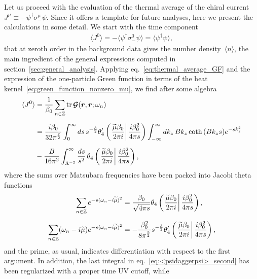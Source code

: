 \documentclass[11pt,a4paper]{article}
\begin{document}
Let us proceed with the evaluation of the thermal average of the chiral 
current~$J^{\mu}\equiv -\psi^{\dagger}\sigma^{\mu}_{-}\psi$. 
Since it offers a template for future analyses, here 
we present the calculations
in some detail. 
We start with the time component
\begin{align}
\langle J^{0}\rangle=-\langle\psi^{\dagger}\sigma^{0}_{-}\psi\rangle=\langle\psi^{\dagger}\psi\rangle,
\end{align}
that at zeroth order in the background data
gives the number density~$\langle n\rangle$, 
the main ingredient
of the general expressions computed in section~\ref{sec:general_analysis}. 
Applying eq.~\eqref{eq:thermal_average_GF} and
the expression of the one-particle Green function in terms of the heat 
kernel~\eqref{eq:green_function_nonzero_mu}, we find after some algebra 
\begin{align}
\langle J^{0}\rangle
&={1\over \beta_{0}}
\sum_{n\in\mathbb{Z}}{\rm tr\,}\boldsymbol{\mathcal{G}}(\boldsymbol{r},\boldsymbol{r};\omega_{n})
\nonumber \\[0.2cm]
&={i\beta_{0}\over 32\pi^{7\over 2}}
\int_{0}^{\infty}ds\,s^{-{3\over 2}}
\theta_{4}'\left(\left.{\widetilde{\mu}\beta_{0}\over 2\pi i}\right|{i\beta_{0}^{2}\over 4\pi s}\right)
\int_{-\infty}^{\infty}dk_{z}\,Bk_{z}\coth{(Bk_{z}s)}
e^{-sk_{z}^{2}} \label{eq:<psidaggerpsi>_second} \\[0.2cm]
&-{B\over 16\pi^2}\int_{\Lambda^{-2}}^{\infty}{ds \over s^{2}}\,
\theta_{4}\left(\left.{\widetilde{\mu}\beta_{0}\over 2\pi i}\right|{i\beta_{0}^{2}\over 4\pi s}\right),
\nonumber
\end{align}
where the sums over Matsubara frequencies have been packed into Jacobi theta functions~\cite{ErdelyiVol2}
\begin{align}
\sum_{n\in\mathbb{Z}}e^{-s(\omega_{n}-i\widetilde{\mu})^{2}}
&={\beta_{0}\over \sqrt{4\pi s}}\theta_{4}\left(\left.
{\widetilde{\mu}\beta_{0}\over 2\pi i}\right|
{i\beta_{0}^{2}\over 4\pi s}\right), \nonumber \\[0.2cm]
\sum_{n\in\mathbb{Z}}(\omega_{n}-i\widetilde{\mu})e^{-s(\omega_{n}-i\widetilde{\mu})^{2}}
&=-{\beta_{0}^{2}\over 8\pi^{3\over 2}} s^{-{3\over 2}}\theta'_{4}\left(\left.
{\widetilde{\mu}\beta_{0}\over 2\pi i}\right|
{i\beta_{0}^{2}\over 4\pi s}\right),
\end{align}
and the prime, as usual, indicates differentiation with respect to the first argument.
In addition, the last integral in eq.~\eqref{eq:<psidaggerpsi>_second} 
has been regularized with a proper time UV cutoff, while
\end{document}
